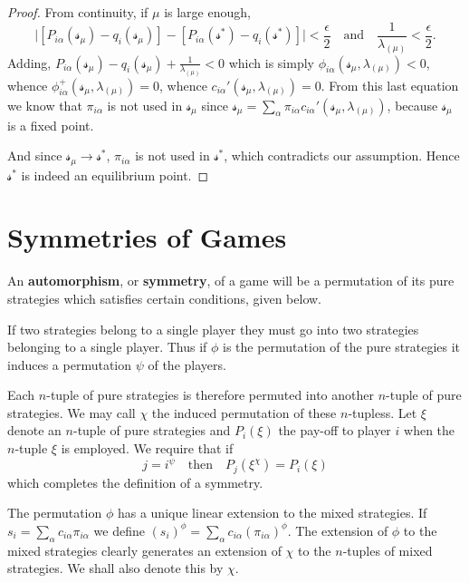 \begin{proof}
    From continuity, if $\mu$ is large enough,
    \[
        \Big| \left[ P_{i\alpha }(\mathcal{s} _{\mu}) -q_i (\mathcal{s} _{\mu})\right] -\left[ P_{i\alpha }(\mathcal{s} ^*)-q_i (\mathcal{s} ^*) \right] \Big| < \frac{\epsilon}{2} \quad \text{and} \quad \frac{1}{\lambda _{(\mu)}}< \frac{\epsilon }{2}.
    \] Adding, $P_{i\alpha }(\mathcal{s} _{\mu})-q_i (\mathcal{s} _{\mu})+\frac{1}{\lambda_{(\mu)}}<0$ which is simply $\phi_{i\alpha }(\mathcal{s} _{\mu},\lambda_{(\mu)})<0$, whence $\phi_{i\alpha }^+(\mathcal{s} _{\mu},\lambda_{(\mu)})=0$, whence $c_{i\alpha }'(\mathcal{s} _{\mu},\lambda_{(\mu)})=0$. From this last equation we know that $\pi_{i\alpha }$ is not used in $\mathcal{s} _{\mu}$ since $\mathcal{s} _{\mu}=\sum_{\alpha }^{} \pi_{i\alpha }c_{i\alpha }'(\mathcal{s} _{\mu},\lambda_{(\mu)})$, because $\mathcal{s} _{\mu}$ is a fixed point.

    And since $\mathcal{s} _{\mu}\to \mathcal{s} ^*$, $\pi_{i\alpha }$ is not used in $\mathcal{s} ^*$, which contradicts our assumption. Hence $\mathcal{s} ^*$ is indeed an equilibrium point.
\end{proof}
\section{Symmetries of Games}
\hspace{\parindent}An \textbf{automorphism}, or \textbf{symmetry}, of a game will be a permutation of its pure strategies which satisfies certain conditions, given below.

If two strategies belong to a single player they must go into two strategies belonging to a single player. Thus if $\phi$ is the permutation of the pure strategies it induces a permutation $\psi$ of the players. 

Each $n$-tuple of pure strategies is therefore permuted into another $n$-tuple of pure strategies. We may call $\chi$ the induced permutation of these $n$-tupless. Let $\xi$ denote an $n$-tuple of pure strategies and $P_i (\xi)$ the pay-off to player $i$ when the $n$-tuple $\xi$ is employed. We require that if \[
    j=i^{\psi} \quad \text{then} \quad P_j (\xi^{\chi})=P_i (\xi)
\] which completes the definition of a symmetry.

The permutation $\phi$ has a unique linear extension to the mixed strategies. If $s_i =\sum_{\alpha }^{} c_{i\alpha }\pi_{i\alpha }$ we define $(s_i )^{\phi}=\sum_{\alpha }^{} c_{i\alpha }(\pi_{i\alpha })^{\phi}.$ The extension of $\phi$ to the mixed strategies clearly generates an extension of $\chi$ to the $n$-tuples of mixed strategies. We shall also denote this by $\chi$.


